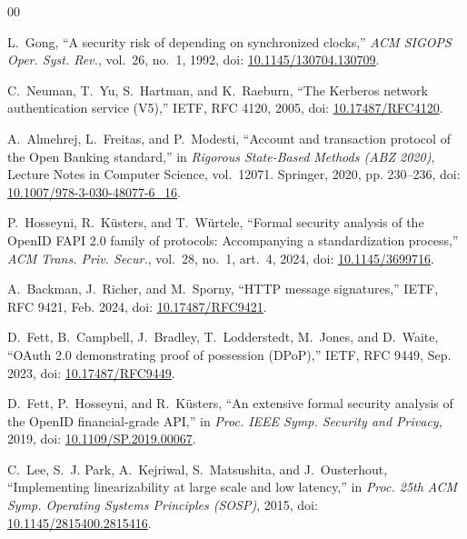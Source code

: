 \documentclass[conference]{IEEEtran}
\begin{document}
\begin{thebibliography}{00}

L.~Gong, ``A security risk of depending on synchronized clocks,'' \emph{ACM SIGOPS Oper. Syst. Rev.}, vol.~26, no.~1, 1992, doi: \href{https://doi.org/10.1145/130704.130709}{10.1145/130704.130709}.

C.~Neuman, T.~Yu, S.~Hartman, and K.~Raeburn, ``The Kerberos network authentication service (V5),'' IETF, RFC 4120, 2005, doi: \href{https://doi.org/10.17487/RFC4120}{10.17487/RFC4120}. %

A.~Almehrej, L.~Freitas, and P.~Modesti, ``Account and transaction protocol of the Open Banking standard,'' in \emph{Rigorous State-Based Methods (ABZ 2020)}, Lecture Notes in Computer Science, vol.~12071. Springer, 2020, pp. 230--236, doi: \href{https://doi.org/10.1007/978-3-030-48077-6_16}{10.1007/978-3-030-48077-6\_16}. %

P.~Hosseyni, R.~K\"usters, and T.~W\"urtele, ``Formal security analysis of the OpenID FAPI 2.0 family of protocols: Accompanying a standardization process,'' \emph{ACM Trans. Priv. Secur.}, vol.~28, no.~1, art.~4, 2024, doi: \href{https://doi.org/10.1145/3699716}{10.1145/3699716}. %

A.~Backman, J.~Richer, and M.~Sporny, ``HTTP message signatures,'' IETF, RFC 9421, Feb. 2024, doi: \href{https://doi.org/10.17487/RFC9421}{10.17487/RFC9421}.

D.~Fett, B.~Campbell, J.~Bradley, T.~Lodderstedt, M.~Jones, and D.~Waite, ``OAuth 2.0 demonstrating proof of possession (DPoP),'' IETF, RFC 9449, Sep. 2023, doi: \href{https://doi.org/10.17487/RFC9449}{10.17487/RFC9449}.

D.~Fett, P.~Hosseyni, and R.~K\"usters, ``An extensive formal security analysis of the OpenID financial-grade API,'' in \emph{Proc. IEEE Symp. Security and Privacy}, 2019, doi: \href{https://doi.org/10.1109/SP.2019.00067}{10.1109/SP.2019.00067}.

C.~Lee, S.~J. Park, A.~Kejriwal, S.~Matsushita, and J.~Ousterhout, ``Implementing linearizability at large scale and low latency,'' in \emph{Proc. 25th ACM Symp. Operating Systems Principles (SOSP)}, 2015, doi: \href{https://doi.org/10.1145/2815400.2815416}{10.1145/2815400.2815416}.


\end{thebibliography}
\end{document}
